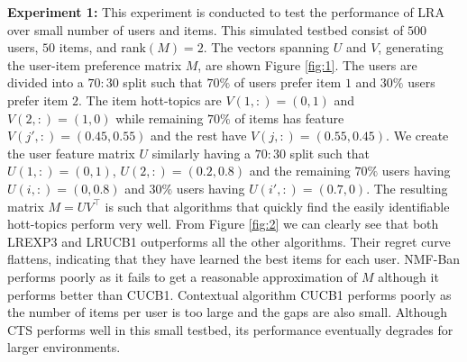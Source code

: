 \textbf{Experiment 1:} This experiment is conducted to test the performance of LRA over small number of users and items. This simulated testbed consist of $500$ users, $50$ items, and rank$(M) = 2$. The vectors spanning $U$ and $V$, generating the user-item preference matrix $M$, are shown Figure \ref{fig:1}. The users are divided into a $70:30$ split such that $70\%$ of users prefer item $1$ and $30\%$ users prefer item  $2$. The item hott-topics are $V(1,:) = (0,1)$ and $V(2,:) = (1, 0)$ while remaining $70\%$ of items has feature $V(j',:) = (0.45, 0.55)$ and the rest have $V(j,:) = (0.55, 0.45)$. We create the user feature matrix $U$ similarly having a $70:30$ split such that $U(1,:) = (0,1)$, $U(2,:) = (0.2,0.8)$ and the remaining $70\%$ users having $U(i,:) = (0,0.8)$ and $30\%$ users having $U(i',:) = (0.7,0)$. The resulting matrix $M =UV^{\intercal}$ is such that algorithms that quickly find the easily identifiable hott-topics perform very well. From Figure \ref{fig:2} we can clearly see that both LREXP3 and LRUCB1 outperforms all the other algorithms. Their regret curve flattens, indicating that they have learned the best items for each user.  NMF-Ban performs poorly as it fails to get a reasonable approximation of $M$ although it performs better than CUCB1. Contextual algorithm CUCB1 performs poorly as the number of items per user is too large and the gaps are also small. Although CTS performs well in this small testbed, its performance eventually degrades for larger environments. 



